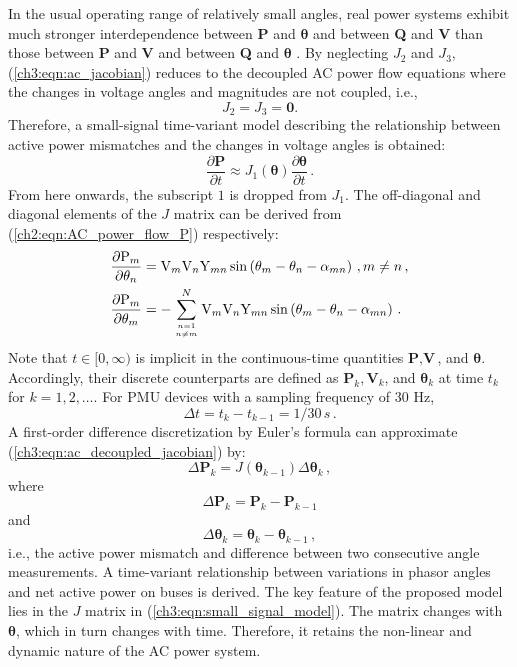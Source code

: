 In the usual operating range of relatively small angles, real power systems exhibit much stronger interdependence between \textbf{P} and $\boldsymbol{\theta}$ and between \textbf{Q} and \textbf{V} than those between \textbf{P} and \textbf{V} and between \textbf{Q} and $\boldsymbol{\theta}$ \cite{murty2017power}. By neglecting ${J}_2$ and ${J}_3$, (\ref{ch3:eqn:ac_jacobian}) reduces to the decoupled AC power flow equations where the changes in voltage angles and magnitudes are not coupled, i.e.,
$$
{J}_2 = {J}_3 = \mathbf{0}.
$$
Therefore, a small-signal time-variant model describing the relationship between active power mismatches and the changes in voltage angles is obtained: 
\begin{equation}
\label{ch3:eqn:ac_decoupled_jacobian}
\frac{\partial \textbf{P}}{\partial t} \approx {J}_1(\boldsymbol{\theta}) \frac{\partial \boldsymbol{\theta}}{\partial t}\,.
\end{equation}
From here onwards, the subscript $1$ is dropped from ${J}_1$. The off-diagonal and diagonal elements of the ${J}$ matrix can be derived from (\ref{ch2:eqn:AC_power_flow_P}) respectively:
\begin{subequations}
\label{ch3:eqn:elements_J}
\begin{align}
    \frac{\partial \text{P}_{m}}{\partial \theta_{n}} 
    & = \text{V}_{m} \text{V}_{n} \text{Y}_{m n} \sin \left( \theta_{m} - \theta_{n} - \alpha_{m n} \right) \,,  m \neq n \,,\label{ch3:eqn:elements_J_off}\\ 
    \frac{\partial \text{P}_{m}}{\partial \theta_{m}} 
    & = -\sum_{ n=1 \atop n \neq m}^{N} \text{V}_{m} \text{V}_{n} \text{Y}_{m n} \sin \left( \theta_{m} - \theta_{n} - \alpha_{m n} \right) \,. \label{ch3:eqn:elements_J_diag} 
\end{align}
\end{subequations}
Note that $t \in [0, \infty)$ is implicit in the continuous-time quantities $\textbf{P}, \textbf{V}$, and $\boldsymbol{\theta}$. Accordingly, their discrete counterparts are defined as $\textbf{P}_k, \textbf{V}_k$, and $\boldsymbol{\theta}_k$ at time $t_k$ for $k = 1, 2, \dots$. For PMU devices with a sampling frequency of 30 Hz, 
$$
\Delta t = t_{k} - t_{k-1} = 1/30 \,s \,.
$$  
A first-order difference discretization by Euler's formula can approximate (\ref{ch3:eqn:ac_decoupled_jacobian}) by:
\begin{equation}
\label{ch3:eqn:small_signal_model}
    \Delta \textbf{P}_k =  {J}(\boldsymbol{\theta}_{k-1}) \Delta \boldsymbol{\theta}_k \,,
\end{equation}
where 
$$
\Delta \textbf{P}_k = \textbf{P}_k - \textbf{P}_{k-1}
$$
and 
$$
\Delta \boldsymbol{\theta}_k = \boldsymbol{\theta}_k - \boldsymbol{\theta}_{k-1} \,,
$$
i.e., the active power mismatch and difference between two consecutive angle measurements. A time-variant relationship between variations in phasor angles and net active power on buses is derived. 
The key feature of the proposed model lies in the ${J}$ matrix in (\ref{ch3:eqn:small_signal_model}). The matrix changes with $\boldsymbol{\theta}$, which in turn changes with time. Therefore, it retains the non-linear and dynamic nature of the AC power system.  

